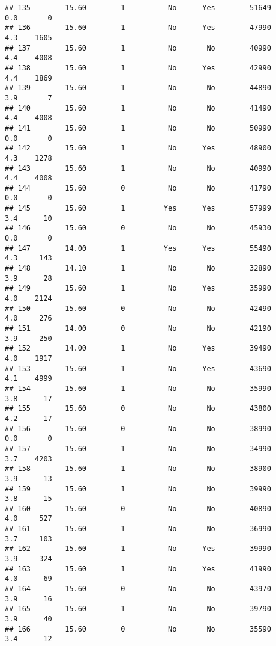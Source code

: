 \documentclass[
]{article}
\begin{document}
\begin{verbatim}
## 135        15.60        1          No      Yes        51649         0.0       0
## 136        15.60        1          No      Yes        47990         4.3    1605
## 137        15.60        1          No       No        40990         4.4    4008
## 138        15.60        1          No      Yes        42990         4.4    1869
## 139        15.60        1          No       No        44890         3.9       7
## 140        15.60        1          No       No        41490         4.4    4008
## 141        15.60        1          No       No        50990         0.0       0
## 142        15.60        1          No      Yes        48900         4.3    1278
## 143        15.60        1          No       No        40990         4.4    4008
## 144        15.60        0          No       No        41790         0.0       0
## 145        15.60        1         Yes      Yes        57999         3.4      10
## 146        15.60        0          No       No        45930         0.0       0
## 147        14.00        1         Yes      Yes        55490         4.3     143
## 148        14.10        1          No       No        32890         3.9      28
## 149        15.60        1          No      Yes        35990         4.0    2124
## 150        15.60        0          No       No        42490         4.0     276
## 151        14.00        0          No       No        42190         3.9     250
## 152        14.00        1          No      Yes        39490         4.0    1917
## 153        15.60        1          No      Yes        43690         4.1    4999
## 154        15.60        1          No       No        35990         3.8      17
## 155        15.60        0          No       No        43800         4.2      17
## 156        15.60        0          No       No        38990         0.0       0
## 157        15.60        1          No       No        34990         3.7    4203
## 158        15.60        1          No       No        38900         3.9      13
## 159        15.60        1          No       No        39990         3.8      15
## 160        15.60        0          No       No        40890         4.0     527
## 161        15.60        1          No       No        36990         3.7     103
## 162        15.60        1          No      Yes        39990         3.9     324
## 163        15.60        1          No      Yes        41990         4.0      69
## 164        15.60        0          No       No        43970         3.9      16
## 165        15.60        1          No       No        39790         3.9      40
## 166        15.60        0          No       No        35590         3.4      12

\end{verbatim}
\end{document}
